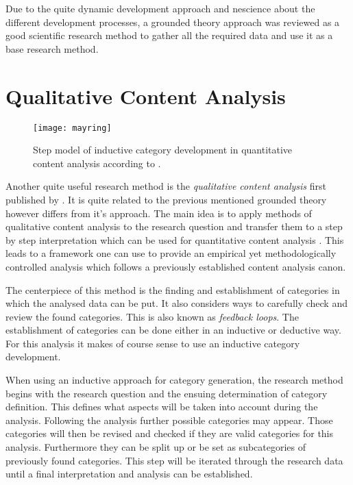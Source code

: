 Due to the quite dynamic development approach and nescience about the different
development processes, a grounded theory approach was reviewed as a good
scientific research method to gather all the required data and use it as a base
research method.


\section{Qualitative Content Analysis} %

\begin{figure}[htbp]
  \centering
  \texttt{[image: mayring]}
  \caption{Step model of inductive category development in quantitative content
    analysis according to \citeauthor{Mayring2008} \cite{Mayring2000,Mayring2008}.}
\end{figure}

Another quite useful research method is the \emph{qualitative content analysis}
first published by \textcite{Mayring2008}. It is quite related to the previous
mentioned grounded theory however differs from it's approach. The main idea is
to apply methods of qualitative content analysis to the research question and
transfer them to a step by step interpretation which can be used for
quantitative content analysis \cite{Mayring2000}. This leads to a framework one
can use to provide an empirical yet methodologically controlled analysis which
follows a previously established content analysis canon.

The centerpiece of this method is the finding and establishment of categories
in which the analysed data can be put. It also considers ways to carefully
check and review the found categories. This is also known as \emph{feedback
loops}. The establishment of categories can be done either in an inductive or
deductive way. For this analysis it makes of course sense to use an inductive
category development.

When using an inductive approach for category generation, the research method
begins with the research question and the ensuing determination of category
definition. This defines what aspects will be taken into account during the
analysis. Following the analysis further possible categories may appear. Those
categories will then be revised and checked if they are valid categories for
this analysis. Furthermore they can be split up or be set as subcategories of
previously found categories. This step will be iterated through the research
data until a final interpretation and analysis can be established.

